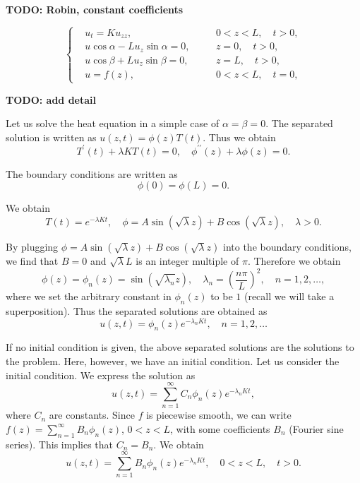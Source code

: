 \textbf{TODO: Robin, constant coefficients}

\begin{equation}
    \left\{\begin{aligned} 
        &u_t=K u_{z z}, && 0<z<L, \quad t>0, 
        \\ 
        &u \cos \alpha-L u_z \sin \alpha=0,\quad && z=0, \quad t>0, 
        \\ 
        &u \cos \beta+L u_z \sin \beta=0, && z=L, \quad t>0, 
        \\
        &u=f(z), && 0<z<L, \quad t=0,
    \end{aligned}\right.
\end{equation}

\textbf{TODO: add detail}

Let us solve the heat equation in a simple case of $\alpha=\beta=0$. The separated solution is written as $u(z, t)=\phi(z) T(t)$. Thus we obtain
$$
T^{\prime}(t)+\lambda K T(t)=0, \quad \phi^{\prime \prime}(z)+\lambda \phi(z)=0 .
$$

The boundary conditions are written as
$$
\phi(0)=\phi(L)=0 .
$$

We obtain
$$
T(t)=e^{-\lambda K t}, \quad \phi=A \sin (\sqrt{\lambda} z)+B \cos (\sqrt{\lambda} z), \quad \lambda>0 .
$$

By plugging $\phi=A \sin (\sqrt{\lambda} z)+B \cos (\sqrt{\lambda} z)$ into the boundary conditions, we find that $B=0$ and $\sqrt{\lambda} L$ is an integer multiple of $\pi$. Therefore we obtain
$$
\phi(z)=\phi_n(z)=\sin \left(\sqrt{\lambda_n} z\right), \quad \lambda_n=\left(\frac{n \pi}{L}\right)^2, \quad n=1,2, \ldots,
$$
where we set the arbitrary constant in $\phi_n(z)$ to be $1$ (recall we will take a superposition). Thus the separated solutions are obtained as
$$
u(z, t)=\phi_n(z) e^{-\lambda_n K t}, \quad n=1,2, \ldots
$$

If no initial condition is given, the above separated solutions are the solutions to the problem. Here, however, we have an initial condition.
Let us consider the initial condition. We express the solution as
$$
u(z, t)=\sum_{n=1}^{\infty} C_n \phi_n(z) e^{-\lambda_n K t},
$$
where $C_n$ are constants. Since $f$ is piecewise smooth, we can write $f(z)=\sum_{n=1}^{\infty} B_n \phi_n(z)$, $0<z<L$, with some coefficients $B_n$ (Fourier sine series). This implies that $C_n=B_n$. We obtain
$$
u(z, t)=\sum_{n=1}^{\infty} B_n \phi_n(z) e^{-\lambda_n K t}, \quad 0<z<L, \quad t>0 .
$$


